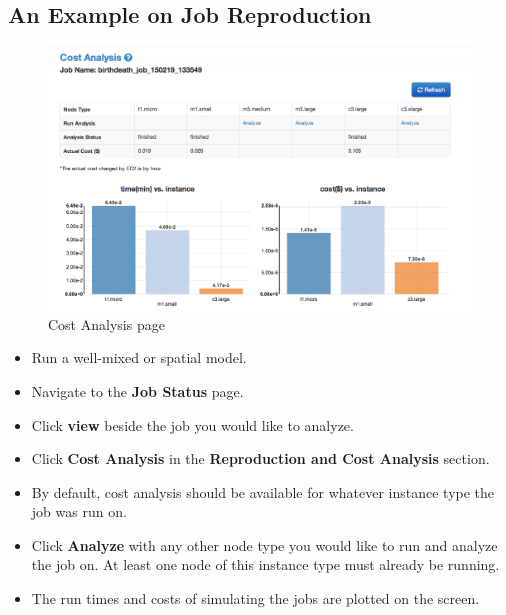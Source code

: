 \subsection{An Example on Job Reproduction}

\begin{figure}[!ht]
\centering
\includegraphics[scale=0.30]{T6/T6_fig_costanalysis.png}
\caption{Cost Analysis page}
\label{fig:2}
\end{figure}

\begin{itemize}
\item Run a well-mixed or spatial model.
\item Navigate to the \textbf{Job Status} page.
\item Click \textbf{view} beside the job you would like to analyze.
\item Click \textbf{Cost Analysis} in the \textbf{Reproduction and Cost Analysis} section.
\item By default, cost analysis should be available for whatever instance type the job was run on.
\item Click \textbf{Analyze} with any other node type you would like to run and analyze the job on. At least one node of this instance type must already be running.
\item The run times and costs of simulating the jobs are plotted on the screen.
\end{itemize}
